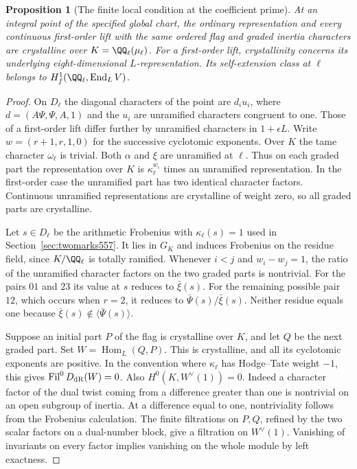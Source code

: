 \documentclass[a4paper,11pt]{article}
\newtheorem{proposition}{Proposition}[section]
\theoremstyle{definition}
\theoremstyle{remark}
\numberwithin{equation}{section}
\begin{document}
\begin{proposition}[The finite local condition at the coefficient prime]
\leavevmode\label{prop:finiteordinary558}
At an integral point of the specified global chart, the
ordinary representation and every continuous first-order lift
with the same ordered flag and graded inertia characters are
crystalline over \(K=\QQ_\ell(\mu_\ell)\). For a first-order lift,
crystallinity concerns its underlying eight-dimensional
\(L\)-representation. Its self-extension class at \(\ell\)
belongs to \(H^1_f(\QQ_\ell,\operatorname{End}_L V)\).
\end{proposition}
\begin{proof}
On \(D_\ell\) the diagonal characters of the point are
\(d_i u_i\), where \(d=(A\Psi,\Psi,A,1)\) and the \(u_i\) are
unramified characters congruent to one. Those of a first-order
lift differ further by unramified characters in \(1+\epsilon L\).
Write \(w=(r+1,r,1,0)\) for the successive cyclotomic exponents.
Over \(K\) the tame character \(\omega_\ell\) is trivial.
Both \(\alpha\) and \(\xi\) are unramified at \(\ell\). Thus on
each graded part the representation over \(K\) is
\(\kappa_\ell^{w_i}\) times an unramified representation. In
the first-order case the unramified part has two identical
character factors. Continuous unramified representations are
crystalline of weight zero, so all graded parts are crystalline.

Let \(s\in D_\ell\) be the arithmetic Frobenius with
\(\kappa_\ell(s)=1\) used in Section~\ref{sec:twomarks557}.
It lies in \(G_K\) and induces Frobenius on the residue field,
since \(K/\QQ_\ell\) is totally ramified. Whenever \(i<j\) and
\(w_i-w_j=1\), the ratio of the unramified character factors
on the two graded parts is nontrivial. For the pairs \(01\) and
\(23\) its value at \(s\) reduces to \(\bar\xi(s)\). For the
remaining possible pair \(12\), which occurs when \(r=2\), it
reduces to \(\bar\Psi(s)/\bar\xi(s)\). Neither residue equals
one because \(\bar\xi(s)\notin\langle\bar\Psi(s)\rangle\).

Suppose an initial part \(P\) of the flag is crystalline over
\(K\), and let \(Q\) be the next graded part. Set
\(W=\operatorname{Hom}_L(Q,P)\). This is crystalline, and all
its cyclotomic exponents are positive. In the convention where
\(\kappa_\ell\) has Hodge--Tate weight \(-1\), this gives
\(\operatorname{Fil}^0D_{\rm dR}(W)=0\).
Also \(H^0(K,W^\vee(1))=0\). Indeed a character factor of the
dual twist coming from a difference greater than one is
nontrivial on an open subgroup of inertia. At a difference equal
to one, nontriviality follows from the Frobenius calculation.
The finite filtrations on \(P,Q\), refined by the two scalar
factors on a dual-number block, give a filtration on \(W^\vee(1)\).
Vanishing of invariants on every factor implies vanishing on
the whole module by left exactness.


\end{proof}
\end{document}
